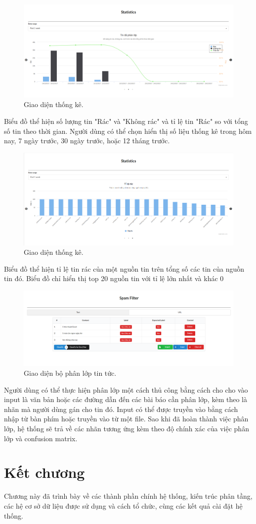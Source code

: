 \begin{figure}[H]
	\centering
	\includegraphics[width=0.96\linewidth]{Chapter3/Chapter3Figs/Chart2.png}
	\caption{Giao diện thống kê.}
	\label{fig:streamingkeywords}
\end{figure}
 Biểu đồ thể hiện số lượng tin "Rác" và "Không rác" và tỉ lệ tin "Rác" so với tổng số tin theo thời gian. Người dùng có thể chọn hiển thị số liệu thống kê trong hôm nay, 7 ngày trước, 30 ngày trước, hoặc 12 tháng trước.

\begin{figure}[H]
	\centering
  \includegraphics[width=0.96\linewidth]{Chapter3/Chapter3Figs/Chart3.png}
  \caption{Giao diện thống kê.}
	\label{fig:streamingkeywords}
\end{figure}
 Biểu đồ thể hiện tỉ lệ tin rác của một nguồn tin trên tổng số các tin của nguồn tin đó. Biểu đồ chỉ hiển thị top 20 nguồn tin với tỉ lệ lớn nhất và khác 0
\begin{figure}[H]
		\centering
	\includegraphics[width=0.96\linewidth]{Chapter3/Chapter3Figs/Filter.png}
	\caption{Giao diện bộ phân lớp tin tức.}
	\label{fig:startclustering}
\end{figure}
 Người dùng có thể thực hiện phân lớp một cách thủ công bằng cách cho cho vào input là văn bản hoặc các đường dẫn đến các bài báo cần phân lớp, kèm theo là nhãn mà người dùng gán cho tin đó. Input có thể được truyền vào bằng cách nhập từ bàn phím hoặc truyền vào từ một file. Sao khi đã hoàn thành việc phân lớp, hệ thống sẽ trả về các nhãn tương ứng kèm theo độ chính xác của việc phân lớp và confusion matrix.
\section{Kết chương}
Chương này đã trình bày về các thành phần chính hệ thống, kiến trúc phân tầng,
các hệ cơ sở dữ liệu được sử dụng và cách tổ chức, cùng các  kết quả cài đặt hệ thống.